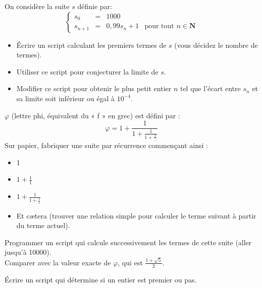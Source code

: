 \begin{exercice}
    On considère la suite $s$ définie par:
    \tabulardefault
    $$\left\lbrace 
    \begin{array}{llll}
    s_0 & = & 1000 & \\
    s_{n+1} & = & 0,99s_n+1 & \textrm{pour tout } n\in\mathbf{N}
    \end{array}
    \right. $$
    
    \begin{itemize}
        \item   \'Ecrire un script calculant les premiers termes de $s$ (vous décidez le nombre de termes).
        \item   Utiliser ce script pour conjecturer la limite de $s$.
        \item   Modifier ce script pour obtenir le plus petit entier $n$ tel que l'écart entre $s_n$ et sa limite soit inférieur ou égal à $10^{-4}$.
        
    \end{itemize}
\end{exercice}

\begin{exercice}
    $\varphi$ (lettre phi, équivalent du  «  f  »  en grec) est défini par : $$\varphi=1+\frac{1}{1+\frac{1}{1+\frac{1}{\ldots}}}$$
    Sur papier, fabriquer une suite par récurrence commençant ainsi :
    \begin{itemize}
        \item   1
        \item   $1+\frac{1}{1}$
        \item   $1+\frac{1}{1+\frac{1}{1}}$
        \item   Et c\ae tera (trouver une relation simple pour calculer le terme suivant à partir du terme actuel).
    \end{itemize}
    Programmer un script qui calcule successivement les termes de cette suite (aller jusqu'à 10000\eme).\\
    
    Comparer avec la valeur exacte de $\varphi$, qui est $\frac{1+\sqrt{5}}{2}$.
\end{exercice}

\begin{exercice}
    \'Ecrire un script qui détermine si un entier est premier ou pas.
\end{exercice}